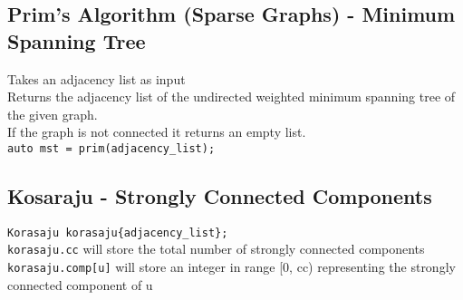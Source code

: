 \subsection{Prim's Algorithm (Sparse Graphs) - Minimum Spanning Tree}

Takes an adjacency list as input \\
Returns the adjacency list of the undirected weighted minimum spanning tree of the given graph. \\
If the graph is not connected it returns an empty list. \\
\verb|auto mst = prim(adjacency_list);| \\



\subsection{Kosaraju - Strongly Connected Components}

\verb|Korasaju korasaju{adjacency_list};| \\
\verb|korasaju.cc| will store the total number of strongly connected components \\
\verb|korasaju.comp[u]| will store an integer in range [0, cc) representing the strongly connected component of u

